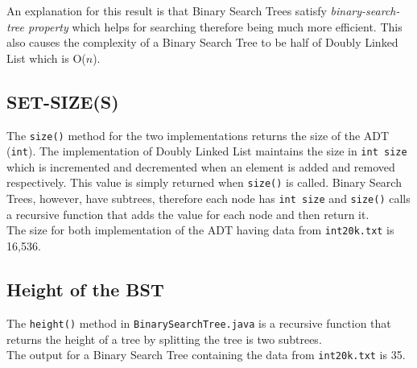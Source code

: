 \documentclass{article}
\newcommand{\code}[1]{\texttt{#1}}
\begin{document}
\smallskip

An explanation for this result is that Binary Search Trees satisfy \textit{binary-search-tree property} which helps for searching therefore being much more efficient. This also causes the complexity of a Binary Search Tree to be half of Doubly Linked List which is O($n$).

\bigskip

\subsection{SET-SIZE(S)}
The \code{size()} method for the two implementations returns the size of the ADT (\code{int}). The implementation of Doubly Linked List maintains the size in \code{int size} which is incremented and decremented when an element is added and removed respectively. This value is simply returned when \code{size()} is called. Binary Search Trees, however, have subtrees, therefore each node has \code{int size} and \code{size()} calls a recursive function that adds the value for each node and then return it. \\
The size for both implementation of the ADT having data from \code{int20k.txt} is 16,536.

\bigskip

\subsection{Height of the BST}
The \code{height()} method in \code{BinarySearchTree.java} is a recursive function that returns the height of a tree by splitting the tree is two subtrees. \\
The output for a Binary Search Tree containing the data from \code{int20k.txt} is 35.
\end{document}

